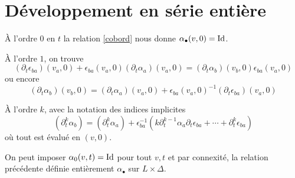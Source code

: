 \documentclass[a4paper]{article}
\begin{document}
\section{Développement en série entière}
\label{sec:orgheadline3}

À l'ordre \(0\) en \(t\) la relation \eqref{cobord} nous donne
\(\alpha_\bullet(v,0) = \operatorname{Id}\).

À l'ordre \(1\), on trouve
\[
(\partial_t\epsilon_{ba})(v_a,0) + \epsilon_{ba}(v_a,0)(\partial_t \alpha_a)(v_a,0)  = (\partial_t \alpha_b)(v_b,0)\epsilon_{ba}(v_a,0)
\]
ou encore
\[
(\partial_t \alpha_b)(v_b,0) = (\partial_t \alpha_a)(v_a,0) + \epsilon_{ba}(v_a,0)^{-1}(\partial_t\epsilon_{ba})(v_a,0)
\]

À l'ordre \(k\), avec la notation des indices implicites
\[
(\partial^k_t \alpha_b) = (\partial^k_t \alpha_a) + \epsilon_{ba}^{-1}\left(
k \partial^{k-1}_t \alpha_a\partial_t \epsilon_{ba} + \cdots  + \partial^k_t\epsilon_{ba}\right)
\] 
où tout est évalué en \((v,0)\).

On peut imposer \(\alpha_{0}(v,t) = \operatorname{Id}\) pour tout \(v,t\) et par connexité, la relation précédente définie entièrement \(\alpha_\bullet\) sur \(L \times \Delta\).
\end{document}
